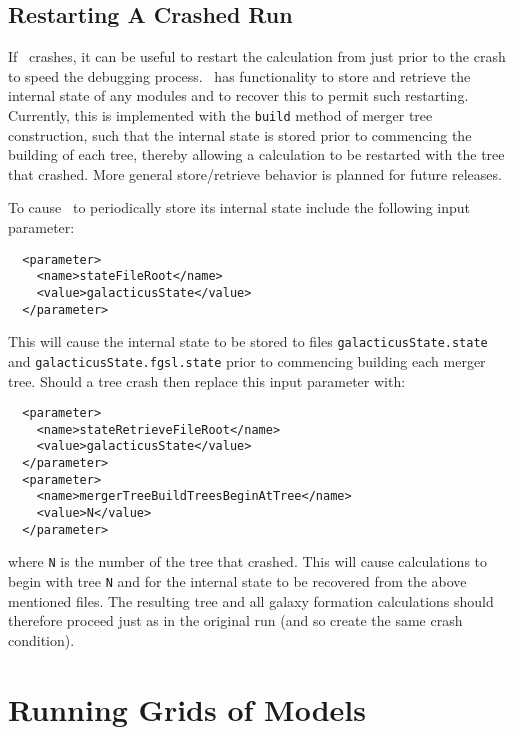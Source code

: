\subsection{Restarting A Crashed Run}\label{sec:Restarting}

If \glc\ crashes, it can be useful to restart the calculation from just prior to the crash to speed the debugging process. \glc\ has functionality to store and retrieve the internal state of any modules and to recover this to permit such restarting. Currently, this is implemented with the {\tt build} method of merger tree construction, such that the internal state is stored prior to commencing the building of each tree, thereby allowing a calculation to be restarted with the tree that crashed. More general store/retrieve behavior is planned for future releases.

To cause \glc\ to periodically store its internal state include the following input parameter:
\begin{verbatim}
  <parameter>
    <name>stateFileRoot</name>
    <value>galacticusState</value>
  </parameter>
\end{verbatim}
This will cause the internal state to be stored to files {\tt galacticusState.state} and {\tt galacticusState.fgsl.state} prior to commencing building each merger tree. Should a tree crash then replace this input parameter with:
\begin{verbatim}
  <parameter>
    <name>stateRetrieveFileRoot</name>
    <value>galacticusState</value>
  </parameter>
  <parameter>
    <name>mergerTreeBuildTreesBeginAtTree</name>
    <value>N</value>
  </parameter>
\end{verbatim}
where {\tt N} is the number of the tree that crashed. This will cause calculations to begin with tree {\tt N} and for the internal state to be recovered from the above mentioned files. The resulting tree and all galaxy formation calculations should therefore proceed just as in the original run (and so create the same crash condition).

\section{Running Grids of Models}\label{sec:RunningGrids}

